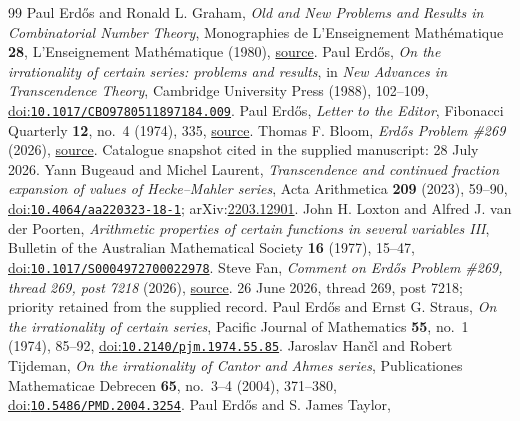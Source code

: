 \documentclass[11pt]{article}
\begin{document}
\begin{thebibliography}{99}
 Paul Erd\H{o}s and Ronald L. Graham,
  \emph{Old and New Problems and Results in Combinatorial Number Theory}, Monographies de L'Enseignement Math\'{e}matique \textbf{28}, L'Enseignement Math\'{e}matique (1980),
  \href{https://mathweb.ucsd.edu/~ronspubs/80_11_number_theory.pdf}{source}.
 Paul Erd\H{o}s,
  \emph{On the irrationality of certain series: problems and results}, in \emph{New Advances in Transcendence Theory}, Cambridge University Press (1988), 102--109,
  \href{https://doi.org/10.1017/CBO9780511897184.009}{doi:\nolinkurl{10.1017/CBO9780511897184.009}}.
 Paul Erd\H{o}s,
  \emph{Letter to the Editor}, Fibonacci Quarterly \textbf{12}, no.~4 (1974), 335,
  \href{https://www.fq.math.ca/Scanned/12-4/letter.pdf}{source}.
 Thomas F. Bloom,
  \emph{Erd\H{o}s Problem \#269} (2026),
  \href{https://www.erdosproblems.com/269}{source}. Catalogue snapshot cited in the supplied manuscript: 28 July 2026.
 Yann Bugeaud and Michel Laurent,
  \emph{Transcendence and continued fraction expansion of values of Hecke--Mahler series}, Acta Arithmetica \textbf{209} (2023), 59--90,
  \href{https://doi.org/10.4064/aa220323-18-1}{doi:\nolinkurl{10.4064/aa220323-18-1}}; arXiv:\href{https://arxiv.org/abs/2203.12901}{2203.12901}.
 John H. Loxton and Alfred J. van der Poorten,
  \emph{Arithmetic properties of certain functions in several variables III}, Bulletin of the Australian Mathematical Society \textbf{16} (1977), 15--47,
  \href{https://doi.org/10.1017/S0004972700022978}{doi:\nolinkurl{10.1017/S0004972700022978}}.
 Steve Fan,
  \emph{Comment on Erd\H{o}s Problem \#269, thread 269, post 7218} (2026),
  \href{https://www.erdosproblems.com/forum/thread/269#post-7218}{source}. 26 June 2026, thread 269, post 7218; priority retained from the supplied record.
 Paul Erd\H{o}s and Ernst G. Straus,
  \emph{On the irrationality of certain series}, Pacific Journal of Mathematics \textbf{55}, no.~1 (1974), 85--92,
  \href{https://doi.org/10.2140/pjm.1974.55.85}{doi:\nolinkurl{10.2140/pjm.1974.55.85}}.
 Jaroslav Han\v{c}l and Robert Tijdeman,
  \emph{On the irrationality of Cantor and Ahmes series}, Publicationes Mathematicae Debrecen \textbf{65}, no.~3--4 (2004), 371--380,
  \href{https://doi.org/10.5486/PMD.2004.3254}{doi:\nolinkurl{10.5486/PMD.2004.3254}}.
 Paul Erd\H{o}s and S. James Taylor,

\end{thebibliography}
\end{document}
